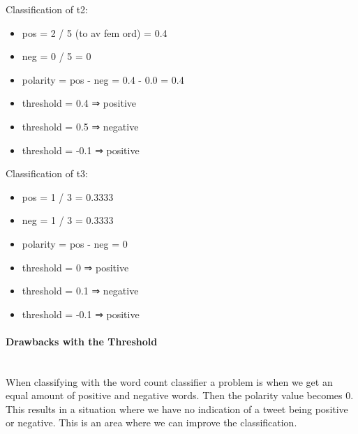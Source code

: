 Classification of t2:
\begin{itemize}
    \item pos = 2 / 5 (to av fem ord) = 0.4
    \item neg = 0 / 5 = 0
    \item polarity = pos - neg = 0.4 - 0.0 = 0.4
    \item threshold = 0.4 ⇒ positive
    \item threshold = 0.5 ⇒ negative
    \item threshold = -0.1 ⇒ positive
\end{itemize}

Classification of t3:
\begin{itemize}
    \item pos = 1 / 3 = 0.3333
    \item neg = 1 / 3 = 0.3333
    \item polarity = pos - neg = 0
    \item threshold = 0 ⇒ positive
    \item threshold = 0.1 ⇒ negative
    \item threshold = -0.1 ⇒ positive
\end{itemize}

\paragraph{Drawbacks with the Threshold}
\hspace{0pt}\\
When classifying with the word count classifier a problem is when we
get an equal amount of positive and negative words. Then the polarity value
becomes 0. This results in a situation where we have no indication of a tweet
being positive or negative. This is an area where we can improve the
classification. 

